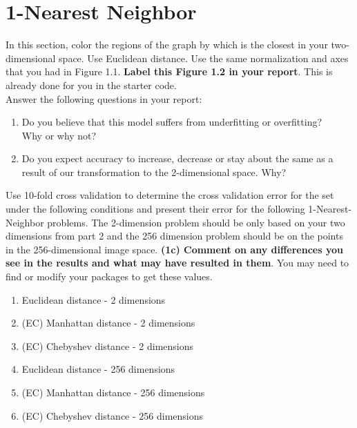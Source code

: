 \documentclass[12pt]{article}
\begin{document}
\section{1-Nearest Neighbor}
In this section, color the regions of the graph by which is the closest in your two-dimensional space. Use Euclidean distance. Use the same normalization and axes that you had in Figure 1.1.  \textbf{Label this Figure 1.2 in your report}. This is already done for you in the starter code.
\\
Answer the following questions in your report:
\begin{enumerate}
\item Do you believe that this model suffers from underfitting or overfitting? \\Why or why not?
\item Do you expect accuracy to increase, decrease or stay about the same as a result of our transformation to the 2-dimensional space. Why? 
\end{enumerate}
Use 10-fold cross validation to determine the cross validation error for the set under the following conditions and present their error for the following 1-Nearest-Neighbor problems. The 2-dimension problem should be only based on your two dimensions from part 2 and the 256 dimension problem should be on the points in the 256-dimensional image space. \textbf{(1c) Comment on any differences you see in the results and what may have resulted in them}. You may need to find or modify your packages to get these values.
\begin{enumerate}
\item Euclidean distance - 2 dimensions
\item (EC) Manhattan distance - 2 dimensions
\item (EC) Chebyshev distance - 2 dimensions
\item Euclidean distance - 256 dimensions
\item (EC) Manhattan distance - 256 dimensions
\item (EC) Chebyshev distance - 256 dimensions
\end{enumerate}
\newpage
\end{document}
